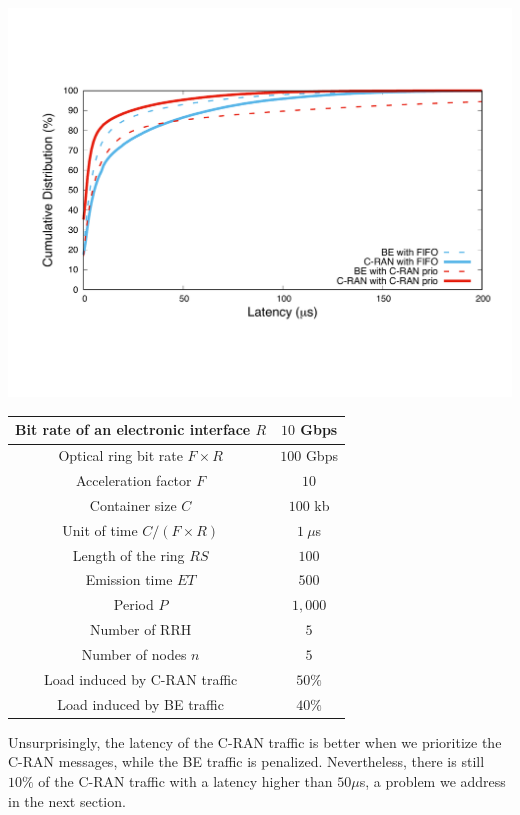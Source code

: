 \documentclass[10pt, conference, letterpaper]{IEEEtran}
\begin{document}
        \begin{center}
      \includegraphics[scale=0.3]{opport.pdf}

         \label{fig:resultopport}

  \scalebox{0.65}
  {

  \begin{tabular}{|c|c|}
  \hline
  Bit rate of an electronic interface $R$ & $10$ Gbps \tabularnewline
  \hline
  Optical ring bit rate $F\times R$ & $100$ Gbps \tabularnewline
  \hline
    Acceleration factor $F$ & $10$  \tabularnewline
  \hline
  Container size  $C$ & $100$ kb  \tabularnewline
  \hline
  Unit of time $C/(F\times R)$ & $1~\mu$s \tabularnewline
  \hline
  Length of the ring $RS$ & $100$ \tabularnewline
  \hline
  Emission time $ET$ & $500$ \tabularnewline
  \hline
   Period $P$ & $1,000$ \tabularnewline
  \hline
  Number of RRH & $5$  \tabularnewline
  \hline
  Number of nodes $n$ & $5$  \tabularnewline
  \hline
   Load induced by C-RAN traffic & $50\%$  \tabularnewline
  \hline
    Load induced by BE traffic & $40\%$  \tabularnewline
  \hline
  \end{tabular}
  }

  \label{fig:params}
      \end{center} 

Unsurprisingly, the latency of the C-RAN traffic is better when we prioritize the C-RAN messages, while the BE traffic is penalized. Nevertheless, there is still $10\%$ of the C-RAN traffic with a latency higher than $50 \mu$s, a problem we address in the next section.
\end{document}
